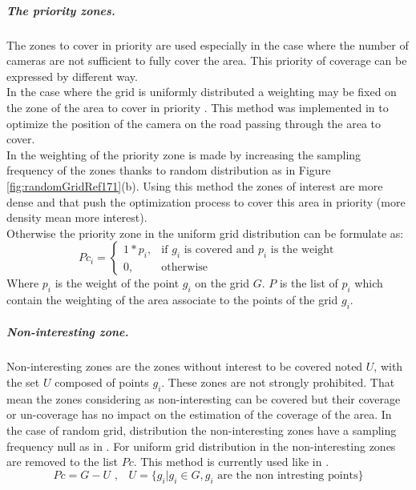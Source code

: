 \subparagraph{The priority zones.}
The zones to cover in priority are used especially in the case where the number of cameras are not sufficient to fully cover the area. This priority of coverage can be expressed by different way. \\
In the case where the grid is uniformly distributed a weighting may be fixed on the zone of the area to cover in priority \cite{141*akbarzadeh2013,84*xu2011}. This method was implemented in \citep{141*akbarzadeh2013} to optimize the position of the camera on the road passing through the area to cover. \\
In \citep{171*horster2006} the weighting of the priority zone is made by increasing the sampling frequency of the zones thanks to random distribution  as in Figure \ref{fig:randomGridRef171}(b). Using this method the zones of interest are more dense and that push the optimization process to cover this area in priority (more density mean more interest).\\
Otherwise the priority zone in the uniform grid distribution can be formulate as: 
  \begin{equation}\label{eq:PciP}
Pc_i= \begin{cases} 1*p_i, & \mbox{if } g_i\mbox{ is covered and  $p_i$ is the weight} \\ 0, & \mbox{otherwise}  \end{cases}
\end{equation}
Where $p_i$ is the weight of the point $g_i$ on the grid $G$. $P $ is the list of $p_i$ which contain the weighting of the area associate to the points of the grid $g_i$. \\

\subparagraph{Non-interesting zone.}
Non-interesting zones are the zones without interest to be covered noted $U$, with the set $U$ composed of points $g_i$. These zones are not strongly prohibited. That mean the zones considering as non-interesting can be covered but their coverage or un-coverage has no impact on the estimation of the coverage of the area. In the case of random grid, distribution the non-interesting zones have a sampling frequency null as in \citep{141*akbarzadeh2013}. For uniform grid distribution in the non-interesting zones are removed to the list $Pc$. This method is currently used like in \cite{22*zhao2008,170*yabuta2008,141*akbarzadeh2013,171*horster2006,84*xu2011} . 
\begin{equation}\label{eq:setU}
Pc=G-U \mbox{ ,    }  \mbox{ }U= \{ g_i | g_i \in G, g_i \mbox{ are the non intresting points} \}
\end{equation}


